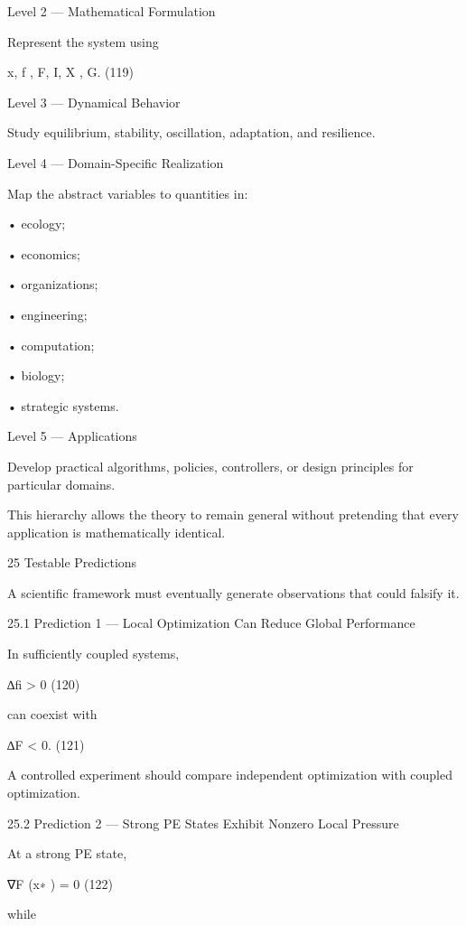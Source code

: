 \documentclass[10pt,a4paper]{article}
\begin{document}
\begin{ManuscriptText}
Level 2 — Mathematical Formulation

Represent the system using


                                           x, f , F, I, X , G.                           (119)


Level 3 — Dynamical Behavior

Study equilibrium, stability, oscillation, adaptation, and resilience.


Level 4 — Domain-Specific Realization

Map the abstract variables to quantities in:


  • ecology;

  • economics;

  • organizations;

  • engineering;

  • computation;

  • biology;

  • strategic systems.


Level 5 — Applications

Develop practical algorithms, policies, controllers, or design principles for particular domains.

This hierarchy allows the theory to remain general without pretending that every application is
mathematically identical.


25     Testable Predictions

A scientific framework must eventually generate observations that could falsify it.


25.1    Prediction 1 — Local Optimization Can Reduce Global Performance

In sufficiently coupled systems,


                                            ∆fi > 0                                         (120)

can coexist with


                                            ∆F < 0.                                         (121)

A controlled experiment should compare independent optimization with coupled optimization.


25.2    Prediction 2 — Strong PE States Exhibit Nonzero Local Pressure

At a strong PE state,


                                               ∇F (x∗ ) = 0                                   (122)

while



\end{ManuscriptText}
\end{document}
